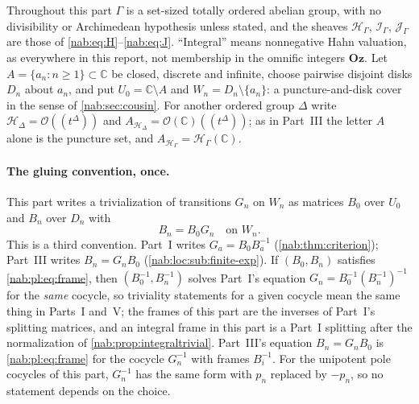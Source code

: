\documentclass[11pt,letterpaper]{article}
\theoremstyle{definition}
\theoremstyle{remark}
\newcommand{\C}{\mathbb C}
\newcommand{\OO}{\mathcal O}
\newcommand{\HH}{\mathscr H_\Gamma}
\newcommand{\II}{\mathscr I_\Gamma}
\newcommand{\JJ}{\mathscr J_\Gamma}
\newcommand{\HD}{\mathscr H_\Delta}
\newcommand{\Oz}{\mathbf{Oz}}
\numberwithin{equation}{section}
\begin{document}
Throughout this part $\Gamma$ is a set-sized totally ordered abelian group, with
no divisibility or Archimedean hypothesis unless stated, and the sheaves $\HH$,
$\II$, $\JJ$ are those of \eqref{nab:eq:H}--\eqref{nab:eq:J}. ``Integral''
means nonnegative Hahn valuation, as everywhere in this report, not membership
in the omnific integers $\Oz$. Let $A=\{a_n:n\geq1\}\subset\C$ be closed,
discrete and infinite, choose pairwise disjoint disks $D_n$ about $a_n$, and put
$U_0=\C\setminus A$ and $W_n=D_n\setminus\{a_n\}$: a puncture-and-disk cover in
the sense of \cref{nab:sec:cousin}. For another ordered group $\Delta$ write
$\HD=\OO((t^\Delta))$ and $A_{\HD}=\OO(\C)((t^\Delta))$; as in Part~III the
letter $A$ alone is the puncture set, and $A_{\HH}=\HH(\C)$.

\paragraph{The gluing convention, once.} This part writes a trivialization of
transitions $G_n$ on $W_n$ as matrices $B_0$ over $U_0$ and $B_n$ over $D_n$
with
\begin{equation}\label{nab:pl:eq:frame}
 B_n=B_0G_n\quad\text{on }W_n .
\end{equation}
This is a third convention. Part~I writes $G_a=B_0B_a^{-1}$
(\cref{nab:thm:criterion}); Part~III writes $B_n=G_nB_0$
(\cref{nab:loc:sub:finite-exp}). If $(B_0,B_n)$ satisfies
\eqref{nab:pl:eq:frame}, then $(B_0^{-1},B_n^{-1})$ solves Part~I's equation
$G_n=B_0^{-1}(B_n^{-1})^{-1}$ for the \emph{same} cocycle, so triviality
statements for a given cocycle mean the same thing in Parts~I and~V; the
frames of this part are the inverses of Part~I's splitting matrices, and an
integral frame in this part is a Part~I splitting after the normalization of
\cref{nab:prop:integraltrivial}. Part~III's equation $B_n=G_nB_0$ is
\eqref{nab:pl:eq:frame} for the cocycle $G_n^{-1}$ with frames $B_i^{-1}$. For
the unipotent pole cocycles of this part, $G_n^{-1}$ has the same form with
$p_n$ replaced by $-p_n$, so no statement depends on the choice.
\end{document}
